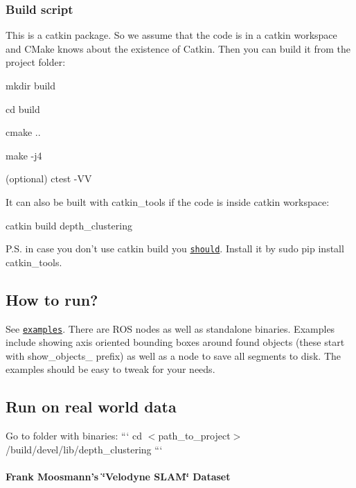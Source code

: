 \subsubsection*{Build script}

This is a catkin package. So we assume that the code is in a catkin workspace and C\-Make knows about the existence of Catkin. Then you can build it from the project folder\-:


\begin{DoxyItemize}
\item {\ttfamily mkdir build}
\item {\ttfamily cd build}
\item {\ttfamily cmake ..}
\item {\ttfamily make -\/j4}
\item (optional) {\ttfamily ctest -\/\-V\-V}
\end{DoxyItemize}

It can also be built with {\ttfamily catkin\-\_\-tools} if the code is inside catkin workspace\-:
\begin{DoxyItemize}
\item {\ttfamily catkin build depth\-\_\-clustering}
\end{DoxyItemize}

P.\-S. in case you don't use {\ttfamily catkin build} you \href{https://catkin-tools.readthedocs.io/en/latest/installing.html}{\tt should}. Install it by {\ttfamily sudo pip install catkin\-\_\-tools}.

\subsection*{How to run?}

See \href{examples/}{\tt examples}. There are R\-O\-S nodes as well as standalone binaries. Examples include showing axis oriented bounding boxes around found objects (these start with {\ttfamily show\-\_\-objects\-\_\-} prefix) as well as a node to save all segments to disk. The examples should be easy to tweak for your needs.

\subsection*{Run on real world data}

Go to folder with binaries\-: ``` cd $<$path\-\_\-to\-\_\-project$>$/build/devel/lib/depth\-\_\-clustering ```

\paragraph*{Frank Moosmann's \char`\"{}\-Velodyne S\-L\-A\-M\char`\"{} Dataset}

